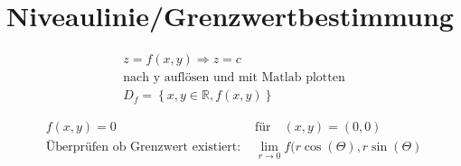 \section{Niveaulinie/Grenzwertbestimmung}

\begin{align*}
z = f(x,y) \Rightarrow z = c\\
\text{nach y auflösen und mit Matlab plotten}\\
D_{f} = \left\{x,y\in\mathbb{R}, f(x,y)\right\}
\end{align*}

\begin{align*}
f(x,y) = 0 \quad&\text{für}\quad (x,y) = (0,0)\\
\text{Überprüfen ob Grenzwert existiert: } &\lim\limits_{r \to 0} f(r\cos(\Theta),r\sin(\Theta) 
\end{align*}
